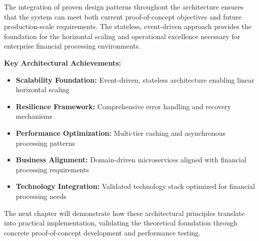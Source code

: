 The integration of proven design patterns throughout the architecture ensures that the system can meet both current proof-of-concept objectives and future production-scale requirements. The stateless, event-driven approach provides the foundation for the horizontal scaling and operational excellence necessary for enterprise financial processing environments.

\textbf{Key Architectural Achievements:}
\begin{itemize}
    \item \textbf{Scalability Foundation:} Event-driven, stateless architecture enabling linear horizontal scaling
    \item \textbf{Resilience Framework:} Comprehensive error handling and recovery mechanisms
    \item \textbf{Performance Optimization:} Multi-tier caching and asynchronous processing patterns
    \item \textbf{Business Alignment:} Domain-driven microservices aligned with financial processing requirements
    \item \textbf{Technology Integration:} Validated technology stack optimized for financial processing needs
\end{itemize}

The next chapter will demonstrate how these architectural principles translate into practical implementation, validating the theoretical foundation through concrete proof-of-concept development and performance testing.
